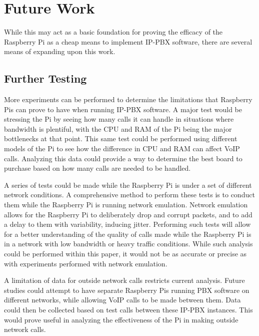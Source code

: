 \section{Future Work} \label{sec:future-work}
    While this may act as a basic foundation for proving the efficacy of the Raspberry Pi as a cheap means to implement IP-PBX software, there are several means of expanding upon this work.
    \subsection{Further Testing}
        More experiments can be performed to determine the limitations that Raspberry Pis can prove to have when running IP-PBX software. A major test would be stressing the Pi by seeing how many calls it can handle in situations where bandwidth is plentiful, with the CPU and RAM of the Pi being the major bottlenecks at that point. This same test could be performed using different models of the Pi to see how the difference in CPU and RAM can affect VoIP calls. Analyzing this data could provide a way to determine the best board to purchase based on how many calls are needed to be handled.
        
        A series of tests could be made while the Raspberry Pi is under a set of different network conditions. A comprehensive method to perform these tests is to conduct them while the Raspberry Pi is running network emulation. Network emulation allows for the Raspberry Pi to deliberately drop and corrupt packets, and to add a delay to them with variability, inducing jitter. Performing such tests will allow for a better understanding of the quality of calls made while the Raspberry Pi is in a network with low bandwidth or heavy traffic conditions. While such analysis could be performed within this paper, it would not be as accurate or precise as with experiments performed with network emulation.
        
        A limitation of data for outside network calls restricts current analysis. Future studies could attempt to have separate Raspberry Pis running PBX software on different networks, while allowing VoIP calls to be made between them. Data could then be collected based on test calls between these IP-PBX instances. This would prove useful in analyzing the effectiveness of the Pi in making outside network calls.
